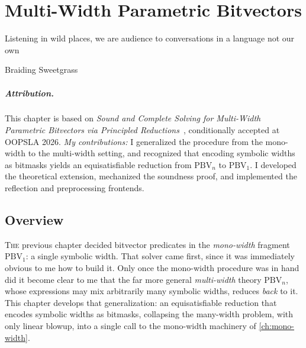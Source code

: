 \chapter{Multi-Width Parametric Bitvectors}
\label{ch:multi-width}
\epigraph{Listening in wild places, we are audience to conversations in a language not our own}{Braiding Sweetgrass}

\paragraph*{Attribution.} This chapter is based on \emph{Sound and Complete
Solving for Multi-Width Parametric Bitvectors via Principled
Reductions}~\citep{bhat2026multiwidth}, conditionally accepted at OOPSLA 2026.
\emph{My contributions:} I generalized the procedure from the mono-width to the
multi-width setting, and recognized that encoding symbolic widths as bitmasks yields an
equisatisfiable reduction from $\text{PBV}_n$ to $\text{PBV}_1$. I developed the
theoretical extension, mechanized the soundness proof, and implemented the
reflection and preprocessing frontends.

\section{Overview}
\label{sec:mwbv:overview}

\lettrine{T}{he} previous chapter decided bitvector predicates in the
\emph{mono-width} fragment $\text{PBV}_1$: a single symbolic width. That solver
came first, since it was immediately obvious to me how to build it.
Only once the mono-width procedure was in hand did it become clear to me that the far more general
\emph{multi-width} theory $\text{PBV}_n$, whose expressions may mix arbitrarily
many symbolic widths, reduces \emph{back} to it. This chapter develops that
generalization: an equisatisfiable reduction that encodes symbolic widths as
bitmasks, collapsing the many-width problem, with only linear blowup, into a
single call to the mono-width machinery of \cref{ch:mono-width}.

